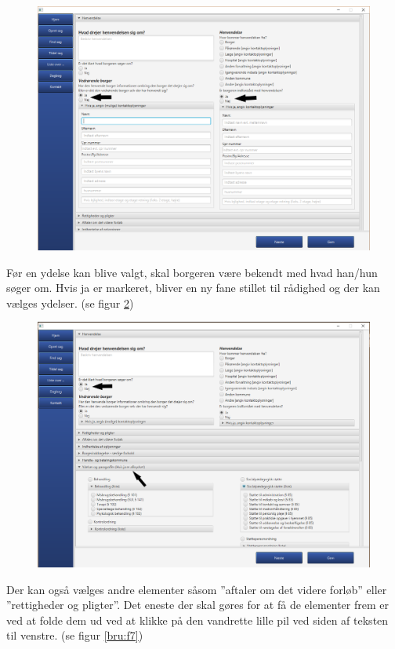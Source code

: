 \begin{figure}[htb!]
  \includegraphics[width = \linewidth]{./PNG/brugervejledning/figur5.PNG} 
  \caption{}  
  \label{bru:f5}
\end{figure}\newpage
Før en ydelse kan blive valgt, skal borgeren være bekendt med hvad han/hun søger om. Hvis ja er markeret, bliver en ny fane stillet til rådighed og der kan vælges ydelser. (se figur \ref{bru:f6})
\begin{figure}[htb!]
  \includegraphics[width = \linewidth]{./PNG/brugervejledning/figur6.PNG} 
  \caption{}  
  \label{bru:f6}
\end{figure}\newpage
Der kan også vælges andre elementer såsom ”aftaler om det videre forløb” eller ”rettigheder og pligter”. Det eneste der skal gøres for at få de elementer frem er ved at folde dem ud ved at klikke på den vandrette lille pil ved siden af teksten til venstre. (se figur \ref{bru:f7})
